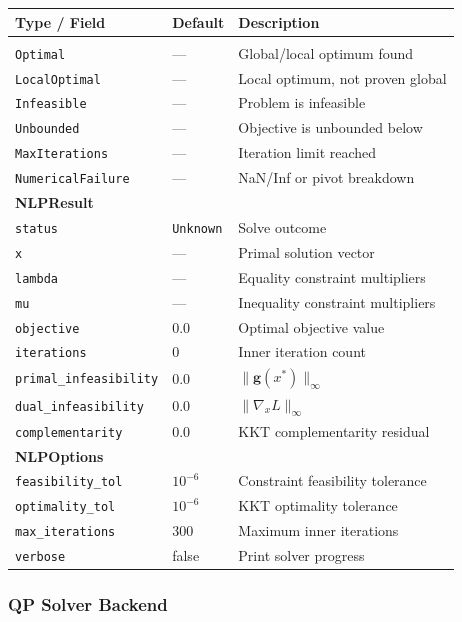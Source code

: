 \begin{longtable}{lll}
\hline\hline
\textbf{Type / Field} & \textbf{Default} & \textbf{Description} \\
\hline\endhead\hline\endfoot
\multicolumn{3}{l}{\textbf{NLPStatus}} \\
\texttt{Optimal} & --- & Global/local optimum found \\
\texttt{LocalOptimal} & --- & Local optimum, not proven global \\
\texttt{Infeasible} & --- & Problem is infeasible \\
\texttt{Unbounded} & --- & Objective is unbounded below \\
\texttt{MaxIterations} & --- & Iteration limit reached \\
\texttt{NumericalFailure} & --- & NaN/Inf or pivot breakdown \\
\hline
\multicolumn{3}{l}{\textbf{NLPResult}} \\
\texttt{status} & \texttt{Unknown} & Solve outcome \\
\texttt{x} & --- & Primal solution vector \\
\texttt{lambda} & --- & Equality constraint multipliers \\
\texttt{mu} & --- & Inequality constraint multipliers \\
\texttt{objective} & 0.0 & Optimal objective value \\
\texttt{iterations} & 0 & Inner iteration count \\
\texttt{primal\_infeasibility} & 0.0 & $\|\mathbf{g}(x^*)\|_\infty$ \\
\texttt{dual\_infeasibility} & 0.0 & $\|\nabla_x L\|_\infty$ \\
\texttt{complementarity} & 0.0 & KKT complementarity residual \\
\hline
\multicolumn{3}{l}{\textbf{NLPOptions}} \\
\texttt{feasibility\_tol} & \(10^{-6}\) & Constraint feasibility tolerance \\
\texttt{optimality\_tol} & \(10^{-6}\) & KKT optimality tolerance \\
\texttt{max\_iterations} & 300 & Maximum inner iterations \\
\texttt{verbose} & false & Print solver progress \\
\hline\hline
\end{longtable}

\subsubsection{QP Solver Backend}

